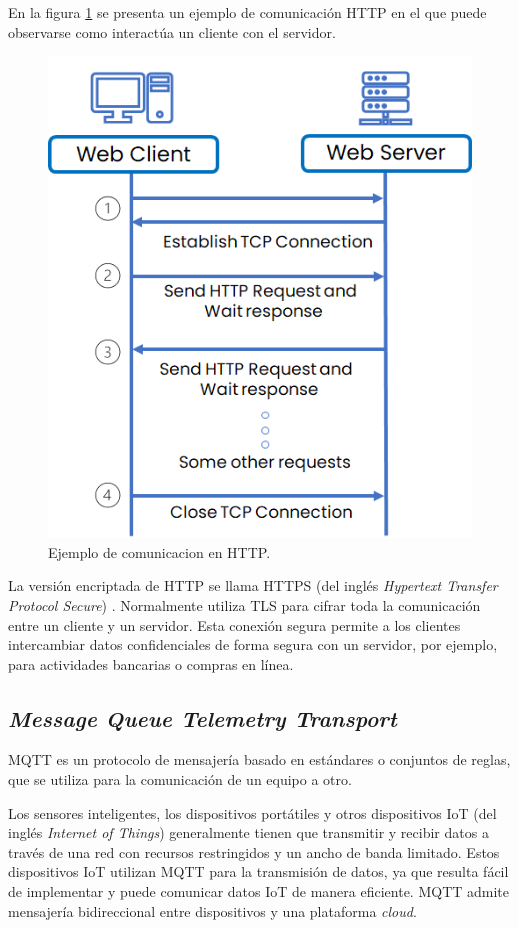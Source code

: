 En la figura \ref{fig:ejemploDeComunicacionEnHTTP} se presenta un ejemplo de comunicación HTTP en el que puede observarse como interactúa un cliente con el servidor.

\begin{figure}[H]
	\centering
	\includegraphics[width=.6\textwidth]{./Figures/Ejemplo de comunicacion en HTTP.png}
	\caption{Ejemplo de comunicacion en HTTP\protect\footnotemark.}
	\label{fig:ejemploDeComunicacionEnHTTP}
\end{figure}


La versión encriptada de HTTP se llama HTTPS (del inglés \textit{Hypertext Transfer Protocol Secure}) \citep{WEBSITE:HTTPS}. Normalmente utiliza TLS para cifrar toda la comunicación entre un cliente y un servidor. Esta conexión segura permite a los clientes intercambiar datos confidenciales de forma segura con un servidor, por ejemplo, para actividades bancarias o compras en línea.

\subsection{\emph{Message Queue Telemetry Transport}}

MQTT es un protocolo de mensajería basado en estándares o conjuntos de reglas, que se utiliza para la comunicación de un equipo a otro. 

Los sensores inteligentes, los dispositivos portátiles y otros dispositivos IoT (del inglés \textit{Internet of Things}) \citep{WEBSITE:IOT} generalmente tienen que transmitir y recibir datos a través de una red con recursos restringidos y un ancho de banda limitado. Estos dispositivos IoT utilizan MQTT para la transmisión de datos, ya que resulta fácil de implementar y puede comunicar datos IoT de manera eficiente. MQTT admite mensajería bidireccional entre dispositivos y una plataforma \textit{cloud}.


